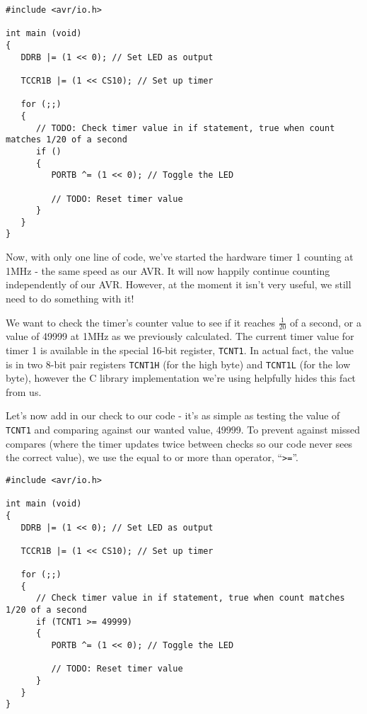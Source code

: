 \documentclass[a4paper,oneside]{book}
\begin{document}
\begin{center}
\begin{lstlisting}
#include <avr/io.h>

int main (void)
{
   DDRB |= (1 << 0); // Set LED as output

   TCCR1B |= (1 << CS10); // Set up timer

   for (;;)
   {
      // TODO: Check timer value in if statement, true when count matches 1/20 of a second
      if ()
      {
         PORTB ^= (1 << 0); // Toggle the LED

         // TODO: Reset timer value
      }
   }
} 
\end{lstlisting}
\end{center}

Now, with only one line of code, we've started the hardware timer 1 counting at 1MHz - the same speed as our AVR. It will now happily continue counting independently of our AVR. However, at the moment it isn't very useful, we still need to do something with it!

We want to check the timer's counter value to see if it reaches \(\frac{1}{20}\) of a second, or a value of 49999 at 1MHz as we previously calculated. The current timer value for timer 1 is available in the special 16-bit register, \texttt{TCNT1}. In actual fact, the value is in two 8-bit pair registers \texttt{TCNT1H} (for the high byte) and \texttt{TCNT1L} (for the low byte), however the C library implementation we're using helpfully hides this fact from us.

Let's now add in our check to our code - it's as simple as testing the value of \texttt{TCNT1} and comparing against our wanted value, 49999. To prevent against missed compares (where the timer updates twice between checks so our code never sees the correct value), we use the equal to or more than operator, ``\texttt{>=}''.

\begin{center}
\begin{lstlisting}
#include <avr/io.h>

int main (void)
{
   DDRB |= (1 << 0); // Set LED as output

   TCCR1B |= (1 << CS10); // Set up timer

   for (;;)
   {
      // Check timer value in if statement, true when count matches 1/20 of a second
      if (TCNT1 >= 49999)
      {
         PORTB ^= (1 << 0); // Toggle the LED

         // TODO: Reset timer value
      }
   }
} 
\end{lstlisting}
\end{center}
\end{document}
